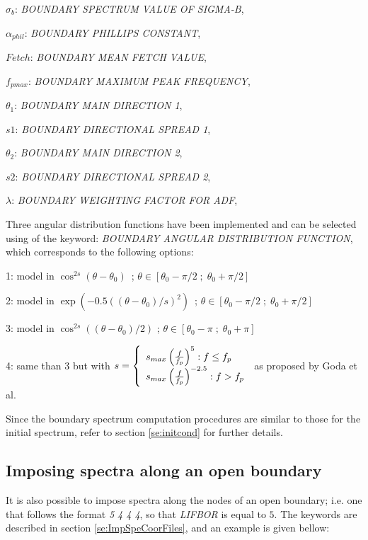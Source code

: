 $\sigma_b$:  \textit{BOUNDARY SPECTRUM VALUE OF SIGMA-B},

 $\alpha_{phil}$:  \textit{BOUNDARY PHILLIPS CONSTANT},

 $Fetch$:  \textit{BOUNDARY MEAN FETCH VALUE},

 $f_{pmax}$:  \textit{BOUNDARY MAXIMUM PEAK FREQUENCY},

 $\theta_1$:  \textit{BOUNDARY MAIN DIRECTION 1},

 $s1$:  \textit{BOUNDARY DIRECTIONAL SPREAD 1},

 $\theta_2$:  \textit{BOUNDARY MAIN DIRECTION 2},

 $s2$:  \textit{BOUNDARY DIRECTIONAL SPREAD 2},

 $\lambda$:  \textit{BOUNDARY WEIGHTING FACTOR FOR ADF},

 Three angular distribution functions have been implemented and can be selected using of the keyword: \textit{BOUNDARY ANGULAR DISTRIBUTION FUNCTION}, which corresponds to the following options:

 1:  model in $\cos ^{2s} (\theta -\theta _{0} )$~; $\theta \in \left[\theta _{0} -\pi /2\; ;\; \theta _{0} +\pi /2\right]$

 2:  model in $\exp \left(-0.5\left(\left(\theta -\theta _{0} \right)/s\right)^{2} \right)$~; $\theta \in \left[\theta _{0} -\pi /2\; ;\; \theta _{0} +\pi /2\right]$

 3:  model in $\cos ^{2s} \left(\left(\theta -\theta _{0} \right)/2\right)$ ; $\theta \in \left[\theta _{0} -\pi \; ;\; \theta _{0} +\pi \right]$  \cite{Mitsuyasu1975}

 4: same than 3 but with $ s=\left\{ \barr{l} s_{max} \left(\frac{f}{f_p} \right)^5 : f\le f_p \\
 s_{max} \left(\frac{f}{f_p} \right)^{-2.5} : f > f_p \earr\right. $ as proposed by Goda et al. \cite{Goda1975}
 

 Since the boundary spectrum computation procedures are similar to those for the initial spectrum, refer to section \ref{se:initcond} for further details.

\subsection{ Imposing spectra along an open boundary}

It is also possible to impose spectra along the nodes of an open boundary; i.e. one that follows the format \textit{5 4 4 4}, so that \textit{LIFBOR} is equal to $5$. The keywords are described in section \ref{se:ImpSpeCoorFiles}, and an example is given bellow:

